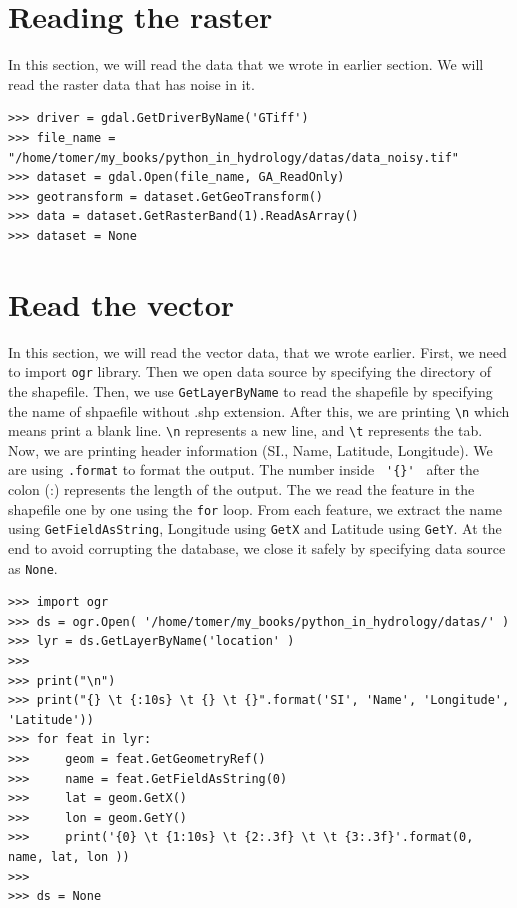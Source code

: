 \documentclass[10pt]{book}
\begin{document}
{\section{Reading the raster}
In this section, we will read the data that we wrote in earlier section. We will read the raster data that has noise in it. 
\beforeverb \begin{verbatim}
>>> driver = gdal.GetDriverByName('GTiff')
>>> file_name = "/home/tomer/my_books/python_in_hydrology/datas/data_noisy.tif"
>>> dataset = gdal.Open(file_name, GA_ReadOnly)
>>> geotransform = dataset.GetGeoTransform()
>>> data = dataset.GetRasterBand(1).ReadAsArray()
>>> dataset = None
\end{verbatim} \afterverb

\section{Read the vector}
In this section, we will read the vector data, that we wrote earlier. First, we need to import \verb"ogr" library. Then we open data source by specifying the directory of the shapefile. Then, we use \verb"GetLayerByName" to read the shapefile by specifying the name of shpaefile without .shp extension. After this, we are printing \verb"\n" which means print a blank line. \verb"\n" represents a new line, and \verb"\t" represents the tab. Now, we are printing header information (SI., Name, Latitude, Longitude). We are using \verb".format" to format the output. The number inside \verb" '{}' " after the colon (:) represents the length of the output. The we read the feature in the shapefile one by one using the \verb"for" loop. From each feature, we extract the name using \verb"GetFieldAsString", Longitude using \verb"GetX" and  Latitude using \verb"GetY". At the end to avoid corrupting the database, we close it safely by specifying data source as \verb"None".

\beforeverb
\begin{verbatim}
>>> import ogr
>>> ds = ogr.Open( '/home/tomer/my_books/python_in_hydrology/datas/' )
>>> lyr = ds.GetLayerByName('location' )
>>> 
>>> print("\n")
>>> print("{} \t {:10s} \t {} \t {}".format('SI', 'Name', 'Longitude', 'Latitude'))
>>> for feat in lyr:
>>>     geom = feat.GetGeometryRef()
>>>     name = feat.GetFieldAsString(0)
>>>     lat = geom.GetX()
>>>     lon = geom.GetY()
>>>     print('{0} \t {1:10s} \t {2:.3f} \t \t {3:.3f}'.format(0, name, lat, lon ))
>>>    
>>> ds = None


\end{verbatim}}
\end{document}
